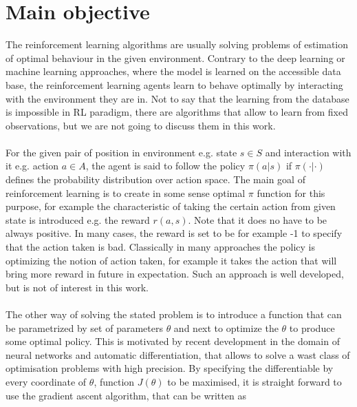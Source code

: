 \documentclass{article}
\begin{document}


\newpage 

\section{Main objective}
The reinforcement learning algorithms are usually solving problems of estimation of optimal behaviour in the given environment. Contrary to the deep learning or machine learning approaches, where the model is learned on the accessible data base, the reinforcement learning agents learn to behave optimally by interacting with the environment they are in. Not to say that the learning from the database is impossible in RL paradigm, there are algorithms that allow to learn from fixed observations, but we are not going to discuss them in this work. 
\\ \\
For the given pair of position in environment e.g. state $s \in S$ and interaction with it e.g. action $a\in A$, the agent is said to follow the policy $\pi(a|s)$ if $\pi(\cdot | \cdot)$  defines the probability distribution over action space. The main goal of reinforcement learning is to create in some sense optimal $\pi$ function for this purpose, for example the characteristic of taking the certain action from given state is introduced e.g. the reward $r(a, s)$. Note that it does no have to be always positive. In many cases, the reward is set to be for example -1 to specify that the action taken is bad. Classically in many approaches the policy is optimizing the notion of action taken, for example it takes the action that will bring more reward in future in expectation. Such an approach is well developed, but is not of interest in this work. \\ \\
The other way of solving the stated problem is to introduce a function that can be parametrized by set of parameters $\theta$ and next to optimize the $\theta$ to produce some optimal policy. This is motivated by recent development in the domain of neural networks and automatic differentiation, that allows to solve a wast class of optimisation problems with high precision. By specifying the differentiable by every coordinate of $\theta$, function $J(\theta)$ to be maximised, it is straight forward to use the gradient ascent algorithm, that can be written as 
\end{document}
